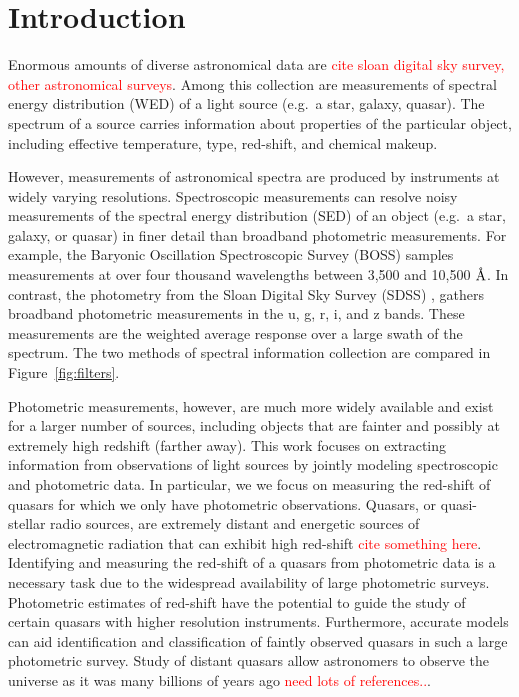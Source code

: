 \documentclass{article}
\newcommand{\angstrom}{\textup{\AA}}
\newcommand{\red}[1]{\textcolor{red}{#1}}
\begin{document}
\section{Introduction}
Enormous amounts of diverse astronomical data are \red{cite sloan digital sky survey, other astronomical surveys}.  Among this collection are measurements of spectral energy distribution (WED) of a light source (e.g.~a star, galaxy, quasar).  
The spectrum of a source carries information about properties of the particular object, including effective temperature, type, red-shift, and chemical makeup.  

However, measurements of astronomical spectra are produced by instruments at widely varying resolutions.  
Spectroscopic measurements can resolve noisy measurements of the spectral energy distribution (SED) of an object (e.g.~a star, galaxy, or quasar) in finer detail than broadband photometric measurements.  For example, the Baryonic Oscillation Spectroscopic Survey (BOSS) \cite{dawson2013baryon} samples measurements at over four thousand wavelengths between 3,500 and 10,500 $\angstrom$.  In contrast, the photometry from the Sloan Digital Sky Survey (SDSS) \cite{kent1994sdss}, gathers broadband photometric measurements in the u, g, r, i, and z bands.  These measurements are the weighted average response over a large swath of the spectrum.  The two methods of spectral information collection are compared in Figure~\ref{fig:filters}. 

Photometric measurements, however, are much more widely available and exist for a larger number of sources, including objects that are fainter and possibly at extremely high redshift (farther away).  This work focuses on extracting information from observations of light sources by jointly modeling spectroscopic and photometric data.  In particular, we we focus on measuring the red-shift of quasars for which we only have photometric observations.  Quasars, or quasi-stellar radio sources, are extremely distant and energetic sources of electromagnetic radiation that can exhibit high red-shift \red{cite something here}.  Identifying and measuring the red-shift of a quasars from photometric data is a necessary task due to the widespread availability of large photometric surveys.  Photometric estimates of red-shift have the potential to guide the study of certain quasars with higher resolution instruments.  Furthermore, accurate models can aid identification and classification of faintly observed quasars in such a large photometric survey.  Study of distant quasars allow astronomers to observe the universe as it was many billions of years ago \red{need lots of references..}. 
\end{document}
